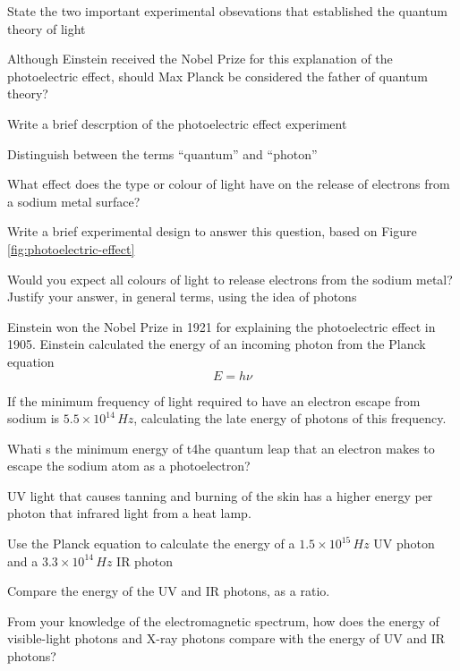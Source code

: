 \begin{problems}
    \item State the two important experimental obsevations that established the quantum theory
        of light
    \item Although Einstein received the Nobel Prize for this explanation of the photoelectric
        effect, should Max Planck be considered the father of quantum theory?
    \item Write a brief descrption of the photoelectric effect experiment
    \item Distinguish between the terms ``quantum'' and ``photon''
    \item What effect does the type or colour of light have on the release of electrons from a
        sodium metal surface?
        \begin{enum-alph}
            \item Write a brief experimental design to answer this question, based on Figure
                \ref{fig:photoelectric-effect}
            \item Would you expect all colours of light to release electrons from the sodium
                metal? Justify your answer, in general terms, using the idea of photons
        \end{enum-alph}
    \item Einstein won the Nobel Prize in 1921 for explaining the photoelectric effect in 1905.
        Einstein calculated the energy of an incoming photon from the Planck equation
        \[
            E=h\nu
        \]
        \begin{enum-alph}
            \item If the minimum frequency of light required to have an electron escape from sodium
                is $5.5\times10^{14}\,\si{Hz}$, calculating the late energy of photons of this
                frequency.
            \item Whati s the minimum energy of t4he quantum leap that an electron makes to
                escape the sodium atom as a photoelectron?
        \end{enum-alph}
    \item UV light that causes tanning and burning of the skin has a higher energy per photon
        that infrared light from a heat lamp.
        \begin{enum-alph}
            \item Use the Planck equation to calculate the energy of a $1.5\times10^{15}\,\si{Hz}$
                UV photon and a $3.3\times10^{14}\,\si{Hz}$ IR photon
            \item Compare the energy of the UV and IR photons, as a ratio.
            \item From your knowledge of the electromagnetic spectrum, how does the energy of
                visible-light photons and X-ray photons compare with the energy of UV and IR
                photons?
        \end{enum-alph}
\end{problems}
